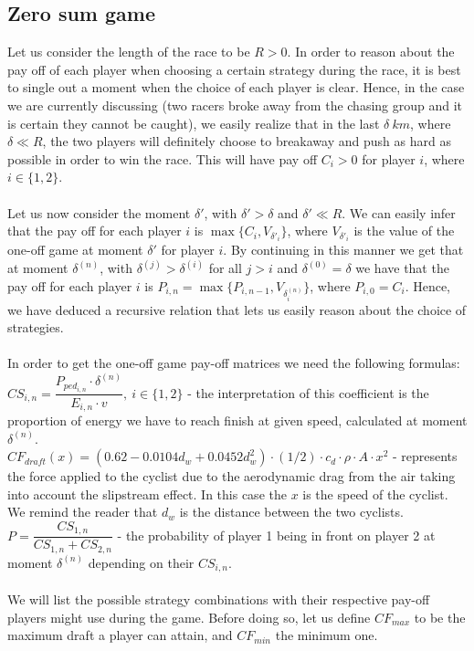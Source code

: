 \documentclass[10pt, a4paper]{report}
\begin{document}
\subsection{Zero sum game}
Let us consider the length of the race to be $R > 0$. In order to reason about the pay off of each player when choosing a certain strategy during the race, it is best to single out a moment when the choice of each player is clear. Hence, in the case we are currently discussing (two racers broke away from the chasing group and it is certain they cannot be caught), we easily realize that in the last $\delta\ km$, where $\delta\ll R$, the two players will definitely choose to breakaway and push as hard as possible in order to win the race. This will have pay off $C_i>0$ for player $i$, where $i \in \{1,2\}$.
\\\\
Let us now consider the moment $\delta'$, with $\delta'>\delta$ and $\delta'\ll R$. We can easily infer that the pay off for each player $i$ is $\max\{C_i,V_{\delta'_i}\}$, where $V_{\delta'_i}$ is the value of the one-off game at moment $\delta'$ for player $i$. By continuing in this manner we get that at moment $\delta^{(n)}$, with $\delta^{(j)}>\delta^{(i)}$ for all $j>i$ and $\delta^{(0)}=\delta$ we have that the pay off for each player $i$ is $P_{i,n} = \max\{P_{i,n-1},V_{\delta^{(n)}_i}\}$, where $P_{i,0} = C_i$. Hence, we have deduced a recursive relation that lets us easily reason about the choice of strategies.
\\\\
In order to get the one-off game pay-off matrices we need the following formulas:\\
$CS_{i,n} = \dfrac{P_{ped_{i,n}} \cdot \delta^{(n)}}{E_{i,n} \cdot v},\ i\in\{1,2\}$ - the interpretation of this coefficient is the proportion of energy we have to reach finish at given speed, calculated at moment $\delta^(n)$.\\
$CF_{draft}(x)=(0.62 - 0.0104d_w + 0.0452 d_w^2)\cdot (1/2)\cdot c_d\cdot \rho\cdot A\cdot x^2$ -  represents the force applied to the cyclist due to the aerodynamic drag from the air taking into account the slipstream effect. In this case the $x$ is the speed of the cyclist. We remind the reader that $d_w$ is the distance between the two cyclists.
$P = \dfrac{CS_{1,n}}{CS_{1,n}+CS_{2,n}}$ - the probability of player 1 being in front on player 2 at moment $\delta^{(n)}$ depending on their $CS_{i,n}$.
\\\\
We will list the possible strategy combinations with their respective pay-off players might use during the game. Before doing so, let us define $CF_{max}$ to be the maximum draft a player can attain, and $CF_{min}$ the minimum one.
\end{document}
